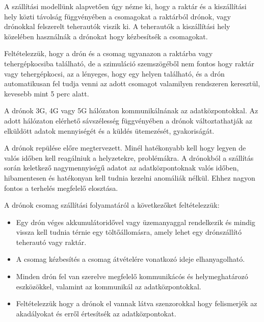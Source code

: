 
A szállítási modellünk alapvetően úgy nézne ki, hogy a raktár és a kiszállítási hely közti távolság függvényében a csomagokat a raktárból drónok, vagy drónokkal felszerelt teherautók viszik ki.
A teherautók a kiszállítási hely közelében használnák a drónokat hogy kézbesítsék a csomagokat.

Feltételezzük, hogy a drón és a csomag ugyanazon a raktárba vagy tehergépkocsiba található, de a szimuláció szemszögéből nem fontos hogy raktár vagy tehergépkocsi, az a lényeges, hogy egy helyen található, és a drón automatikusan fel tudja venni az adott csomagot
valamilyen rendszeren keresztül, kevesebb mint 5 perc alatt.

A drónok 3G, 4G vagy 5G hálózaton kommunikálnának az adatközpontokkal.
Az adott hálózaton elérhető sávszélesség függvényében a drónok változtathatják az elküldött adatok mennyiségét és a küldés ütemezését, gyakoriságát.

A drónok repülése előre megtervezett. Minél hatékonyabb kell hogy legyen de valós időben kell reagálniuk a helyzetekre, problémákra.
A drónokból a szállítás során keletkező nagymennyiségű adatot az adatközpontoknak valós időben, hibamentesen
és hatékonyan kell tudnia kezelni anomáliák nélkül.
Ehhez nagyon fontos a terhelés megfelelő elosztása.

A drónok csomag szállítási folyamatáról a következőket feltételezzük:
\begin{itemize}
    \item Egy drón  véges akkumulátoridővel vagy üzemanyaggal rendelkezik és mindig vissza kell tudnia térnie egy töltőállomásra, amely lehet egy drónszállító teherautó vagy raktár.
    \item A csomag kézbesítés a csomag átvételére vonatkozó ideje elhanyagolható.
    \item Minden drón fel van szerelve megfelelő kommunikácós és helymeghatározó eszközökkel, valamint az kommunikál az adatközpontokkal.
    \item Feltételezzük hogy a drónok el vannak látva szenzorokkal hogy felismerjék az akadályokat és erről értesítsék az adatközpontokat.
\end{itemize}

